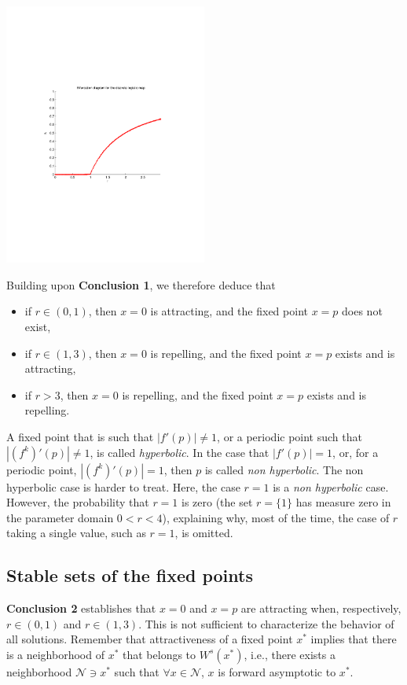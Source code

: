 \begin{center}
\includegraphics[width=0.5\textwidth]
{../figs_02_population_growth/bif_cascade_1}
\end{center}

\vskip0.5cm
 Building upon {\bf Conclusion 1}, we therefore deduce that
\begin{itemize}
\item if $r\in(0,1)$, then $x=0$ is attracting, and the fixed point $x=p$ does not exist,
\item if $r\in(1,3)$, then $x=0$ is repelling, and the fixed point $x=p$ exists and is attracting,
\item if $r>3$, then $x=0$ is repelling, and the fixed point $x=p$ exists and is repelling.
\end{itemize}


\begin{remark}
A fixed point that is such that $|f'(p)|\neq 1$, or a periodic point such that $|(f^k)'(p)|\neq 1$, is called \emph{hyperbolic}. In the case that $|f'(p)|=1$, or, for a periodic point, $|(f^k)'(p)|=1$, then $p$ is called \emph{non hyperbolic}. The non hyperbolic case is harder to treat. Here, the case $r=1$ is a \emph{non hyperbolic} case. However, the probability that $r=1$ is zero (the set $r=\{1\}$ has measure zero in the parameter domain $0<r<4$), explaining why, most of the time, the case of $r$ taking a single value, such as $r=1$, is omitted.
\end{remark}



\subsection{Stable sets of the fixed points}
{\bf Conclusion 2} establishes that $x=0$ and $x=p$ are attracting when, respectively, $r\in(0,1)$ and $r\in(1,3)$. This is not sufficient to characterize the behavior of all solutions. Remember that attractiveness of a fixed point $x^*$ implies that there is a neighborhood of $x^*$ that belongs to $W^s(x^*)$, i.e., there exists 
a neighborhood $\mathcal{N}\ni x^*$ such that $\forall x\in\mathcal{N}$, $x$ is forward asymptotic to $x^*$.

